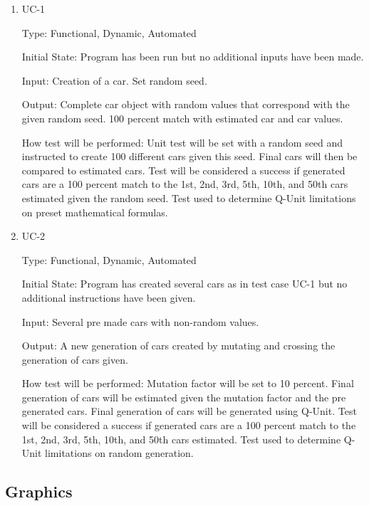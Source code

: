 \documentclass[12pt, titlepage]{article}
\begin{document}
\begin{enumerate}

\item{UC-1\\}

Type: Functional, Dynamic, Automated
					
Initial State: Program has been run but no additional inputs have been made.
					
Input: Creation of a car. Set random seed.
					
Output: Complete car object with random values that correspond with the given 
random seed. 100 percent match with estimated car and car values.
					
How test will be performed: Unit test will be set with a random seed and 
instructed to create 100 different cars given this seed. Final cars will then be 
compared to estimated cars. Test will be considered a success if generated cars 
are a 100 percent match to the 1st, 2nd, 3rd, 5th, 10th, and 50th cars estimated 
given the random seed. Test used to determine Q-Unit limitations on preset 
mathematical formulas.
					
\item{UC-2\\}

Type: Functional, Dynamic, Automated
					
Initial State: Program has created several cars as in test case UC-1 but no 
additional instructions have been given.
					
Input: Several pre made cars with non-random values.
					
Output: A new generation of cars created by mutating and crossing the generation 
of cars given.
					
How test will be performed: Mutation factor will be set to 10 percent. Final 
generation of cars will be estimated given the mutation factor and the pre 
generated cars. Final generation of cars will be generated using Q-Unit. Test 
will be considered a success if generated cars are a 100 percent match to the 
1st, 2nd, 3rd, 5th, 10th, and 50th cars estimated. Test used to determine Q-Unit 
limitations on random generation.

\end{enumerate}

\subsection{Graphics}
\end{document}
